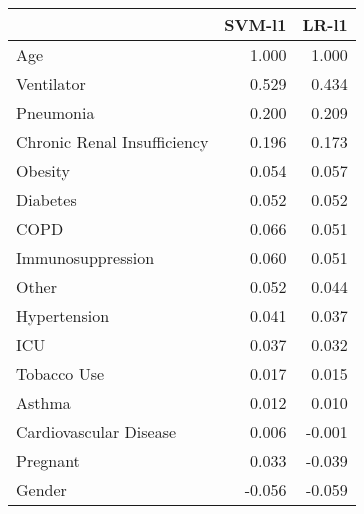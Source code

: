 \begin{tabular}{lrr}
\toprule
{} &  SVM-l1 &  LR-l1 \\
\midrule
Age                         &   1.000 &  1.000 \\
Ventilator                  &   0.529 &  0.434 \\
Pneumonia                   &   0.200 &  0.209 \\
Chronic Renal Insufficiency &   0.196 &  0.173 \\
Obesity                     &   0.054 &  0.057 \\
Diabetes                    &   0.052 &  0.052 \\
COPD                        &   0.066 &  0.051 \\
Immunosuppression           &   0.060 &  0.051 \\
Other                       &   0.052 &  0.044 \\
Hypertension                &   0.041 &  0.037 \\
ICU                         &   0.037 &  0.032 \\
Tobacco Use                 &   0.017 &  0.015 \\
Asthma                      &   0.012 &  0.010 \\
Cardiovascular Disease      &   0.006 & -0.001 \\
Pregnant                    &   0.033 & -0.039 \\
Gender                      &  -0.056 & -0.059 \\
\bottomrule
\end{tabular}
